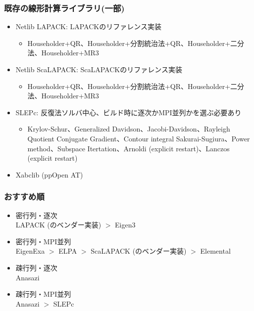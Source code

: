 \begin{frame}
  \frametitle{既存の線形計算ライブラリ(一部)}
  \begin{itemize}
  \item Netlib LAPACK: LAPACKのリファレンス実装
    \begin{itemize}
      \item Householder+QR、Householder+分割統治法+QR、Householder+二分法、Householder+MR3
    \end{itemize}
  \item Netlib ScaLAPACK: ScaLAPACKのリファレンス実装
    \begin{itemize}
      \item Householder+QR、Householder+分割統治法+QR、Householder+二分法、Householder+MR3
    \end{itemize}
  \item SLEPc: 反復法ソルバ中心、ビルド時に逐次かMPI並列かを選ぶ必要あり
    \begin{itemize}
      \item Krylov-Schur、Generalized Davidson、Jacobi-Davidson、Rayleigh Quotient Conjugate Gradient、Contour integral Sakurai-Sugiura、Power method、Subspace Itertation、Arnoldi (explicit restart)、Lanczos (explicit restart) \\
    \end{itemize}
  \item Xabclib (ppOpen AT)
  \end{itemize}
\end{frame}

\begin{frame}
  \frametitle{おすすめ順}
  \begin{itemize}
  \item 密行列・逐次 \\
    LAPACK (のベンダー実装) $>$ Eigen3
  \item 密行列・MPI並列 \\
    EigenExa $>$ ELPA $>$ ScaLAPACK (のベンダー実装) $>$ Elemental
  \item 疎行列・逐次 \\
    Anasazi
  \item 疎行列・MPI並列 \\
    Anasazi $>$ SLEPc
  \end{itemize}
\end{frame}

